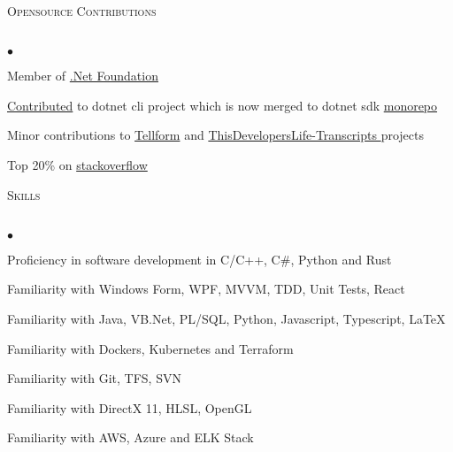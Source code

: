 \documentclass{article}
\newcommand{\lineunder}{\vspace*{-8pt} \\ \hspace*{-18pt} \hrulefill \\}
\newcommand{\header}[1]{{\hspace*{-15pt}\vspace*{6pt} \textsc{#1}} \vspace*{-6pt} \lineunder}
\newenvironment{achievements}{\begin{list}{$\bullet$}{\topsep 0pt \itemsep -2pt}}{\vspace*{4pt}\end{list}}
\begin{document}
\header{Opensource Contributions}
\begin{achievements}
\item
  Member of \href{https://dotnetfoundation.org/}{.Net Foundation}
\item
  \href{https://github.com/dotnet/cli/pull/10914}{Contributed} to dotnet cli project which is now merged to dotnet sdk \href{https://github.com/dotnet/sdk}{monorepo}
\item
  Minor contributions to \href{https://github.com/tellform/tellform}{Tellform} and \href{https://github.com/shanselman/ThisDevelopersLife-Transcripts/pull/36}{ThisDevelopersLife-Transcripts
} projects
\item
  Top 20\% on \href{https://stackoverflow.com/users/713683/luqi}{stackoverflow} 
\end{achievements}

\header{Skills}
\begin{achievements}
\item Proficiency in software development in C/C++, C\#, Python and Rust
\item Familiarity with Windows Form, WPF, MVVM, TDD, Unit Tests, React
\item Familiarity with Java, VB.Net, PL/SQL, Python, Javascript, Typescript, \LaTeX
\item Familiarity with Dockers, Kubernetes and Terraform
\item Familiarity with Git, TFS, SVN 
\item Familiarity with DirectX 11, HLSL, OpenGL 
\item Familiarity with AWS, Azure and ELK Stack
\end{achievements}
\end{document}
